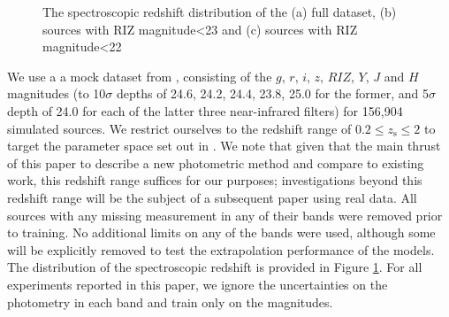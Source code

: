 \documentclass[useAMS,usenatbib,fleqn]{mn2e}
\begin{document}
\begin{figure}
       \caption{The spectroscopic redshift distribution of the (a) full dataset, (b) sources with RIZ magnitude\textless23 and (c) sources with RIZ magnitude\textless22}
	 \label{fig-zspec-hostogram}
\end{figure}

We use a a mock dataset from \citet{jouvel09}, consisting of the $g$, $r$, $i$, $z$, $RIZ$, $Y$, $J$ and $H$ magnitudes (to 10$\sigma$ depths of 24.6, 24.2, 24.4, 23.8, 25.0 for the former, and 5$\sigma$ depth of 24.0 for each of the latter three near-infrared filters) for 156,904 simulated sources. We restrict ourselves to the redshift range of $0.2 \le z_\textrm{s} \le 2$ to target the parameter space set out in \cite{laureijs2011}. We note that given that the main thrust of this paper to describe a new photometric method and compare to existing work, this redshift range suffices for our purposes; investigations beyond this redshift range will be the subject of a subsequent paper using real data.
All sources with any missing measurement in any of their bands were removed prior to training. No additional limits on any of the bands were used, although some will be explicitly removed to test the extrapolation performance of the models. The distribution of the spectroscopic redshift is provided in Figure \ref{fig-zspec-hostogram}. For all experiments reported in this paper, we ignore the uncertainties on the photometry in each band and train only on the magnitudes. 
\end{document}
